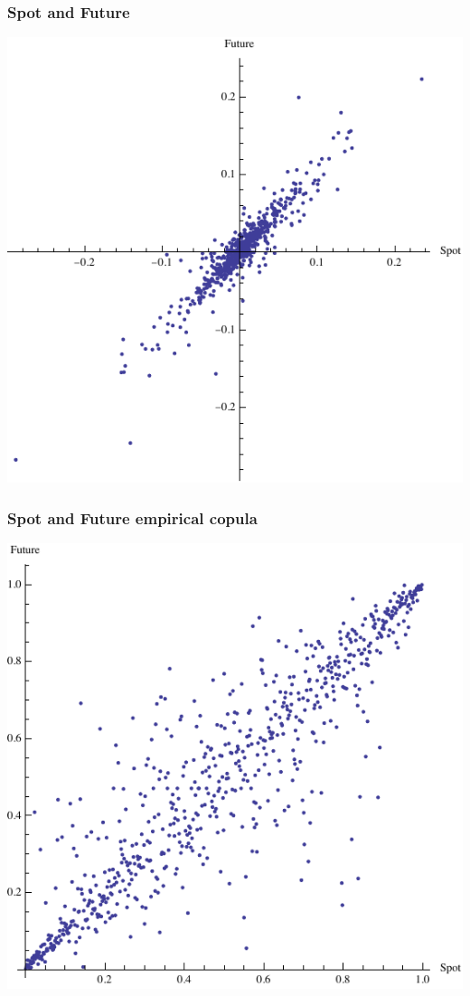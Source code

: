 \documentclass[10pt,mathserif]{beamer}
\renewcommand{\(}{\begin{columns}}
\renewcommand{\)}{\end{columns}}
\newcommand{\<}[1]{\begin{column}{#1}}
\renewcommand{\>}{\end{column}}
\theoremstyle{definition}
\begin{document}
\begin{frame}
  \frametitle{Spot and Future}
  \begin{center}
    \includegraphics[scale=.8]{../_pics/btc_future_scatter.pdf}
  \end{center}
\end{frame}

\begin{frame}
  \frametitle{Spot and Future empirical copula}
  \begin{center}
    \includegraphics[scale=.8]{../_pics/btc_future_copula_scatter.pdf}
  \end{center}
\end{frame}
\end{document}
